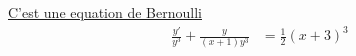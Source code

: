 \underline{C'est une equation de Bernoulli}
\begin{align*}
	\frac {y'}{y^3} + \frac{y}{(x+1)y^3} &= \frac{1}{2}(x+3)^3 \\
\end{align*}